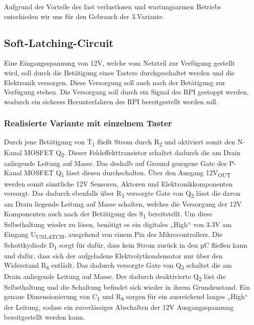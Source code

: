 Aufgrund der Vorteile des fast verlustlosen und wartungsarmen Betriebs entschieden wir uns für den Gebrauch der 3.Variante.

\newpage

\subsection{Soft-Latching-Circuit}

Eine Eingangsspannung von 12V, welche vom Netzteil zur Verfügung gestellt wird, soll durch die Betätigung eines Tasters durchgeschaltet werden und die Elektronik versorgen.
Diese Versorgung soll auch nach der Betätigung zur Verfügung stehen.
Die Versorgung soll durch ein Signal des RPI gestoppt werden, wodurch ein sicheres Herunterfahren des RPI bereitgestellt werden soll.

\subsubsection{Realisierte Variante mit einzelnem Taster}

Durch jene Betätigung von T\textsubscript{1} fließt Strom durch R\textsubscript{2} und aktiviert somit den N-Kanal MOSFET Q\textsubscript{2}.
Dieser Feldeffekttransistor schaltet dadurch die am Drain anliegende Leitung auf Masse.
Das deshalb auf Ground gezogene Gate des P-Kanal MOSFET Q\textsubscript{1} lässt diesen durchschalten.
Über den Ausgang 12V\textsubscript{OUT} werden somit sämtliche 12V Sensoren, Aktoren und Elektronikkomponenten versorgt.
Das dadurch ebenfalls über R\textsubscript{3} versorgte Gate von Q\textsubscript{2} lässt die davon am Drain liegende Leitung auf Masse schalten,
welches die Versorgung der 12V Komponenten auch nach der Betätigung des S\textsubscript{1} bereitstellt.
Um diese Selbsthaltung wieder zu lösen, benötigt es ein digitales „High“ von 3.3V am Eingang U\textsubscript{UNLATCH}, ausgehend von einem Pin des Mikrocontrollers.
Die Schottkydiode D\textsubscript{1} sorgt für dafür, dass kein Strom zurück in den µC fließen kann und dafür,
dass sich der aufgeladene Elektrolytkondensator nur über den Widerstand R\textsubscript{8} entlädt.
Das dadurch versorgte Gate von Q\textsubscript{3} schaltet die am Drain anliegende Leitung auf Masse.
Der dadurch deaktivierte Q\textsubscript{2} löst die Selbsthaltung und die Schaltung befindet sich wieder in ihrem Grundzustand.
Ein genaue Dimensionierung von C\textsubscript{1} und R\textsubscript{8} sorgen für ein ausreichend langes „High“ der Leitung,
sodass ein zuverlässiges Abschalten der 12V Ausgangsspannung bereitgestellt werden kann. \\

